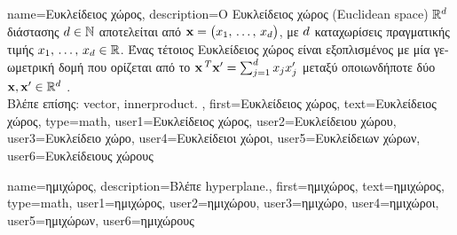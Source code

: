{name={\foreignlanguage{greek}{Ευκλείδειος χώρος}}, 
	description={\foreignlanguage{greek}{Ο Ευκλείδειος χώρος} 
		(Euclidean space) $\mathbb{R}^{d}$ \foreignlanguage{greek}{διάστασης $d \in \mathbb{N}$ αποτελείται 
		από}  ${\bf x}= \big(x_{1}, \,\ldots, \,x_{d}\big)$, 
		\foreignlanguage{greek}{με $d$ καταχωρίσεις πραγματικής τιμής 
		$x_{1}, \,\ldots, \,x_{d} \in \mathbb{R}$. 
		Ένας τέτοιος Ευκλείδειος χώρος είναι εξοπλισμένος με μία γεωμετρική δομή 
		που ορίζεται από το}  
		${\bf x}\,^{T} {\bf x}' = \sum_{j=1}^{d} x_{j} x'_{j}$ 
		\foreignlanguage{greek}{μεταξύ οποιωνδήποτε δύο}  
		${\bf x},{\bf x}' \in \mathbb{R}^{d}$ \cite{RudinBookPrinciplesMatheAnalysis}. 
		\\
		\foreignlanguage{greek}{Βλέπε επίσης:} \gls{vector}, \gls{innerproduct}. },
	first={\foreignlanguage{greek}{Ευκλείδειος χώρος}}, 
	text={\foreignlanguage{greek}{Ευκλείδειος χώρος}},
	type=math,
	user1={\foreignlanguage{greek}{Ευκλείδειος χώρος}}, %
  	user2={\foreignlanguage{greek}{Ευκλείδειου χώρου}}, %
	user3={\foreignlanguage{greek}{Ευ\-κλεί\-δει\-ο χώρο}}, %
	user4={\foreignlanguage{greek}{Ευκλείδειοι χώροι}}, %
	user5={\foreignlanguage{greek}{Ευκλείδειων χώρων}}, %
	user6={\foreignlanguage{greek}{Ευκλείδειους χώρους}} %
}

{name={\foreignlanguage{greek}{ημιχώρος}},
	description={\foreignlanguage{greek}{Βλέπε} \gls{hyperplane}.},
	first={\foreignlanguage{greek}{ημιχώρος}},
	text={\foreignlanguage{greek}{ημιχώρος}},
	type=math,
	user1={\foreignlanguage{greek}{ημιχώρος}}, %
  	user2={\foreignlanguage{greek}{ημιχώρου}}, %
	user3={\foreignlanguage{greek}{ημιχώρο}}, %
	user4={\foreignlanguage{greek}{ημιχώροι}}, %
	user5={\foreignlanguage{greek}{ημιχώρων}}, %
	user6={\foreignlanguage{greek}{ημιχώρους}} %
}

